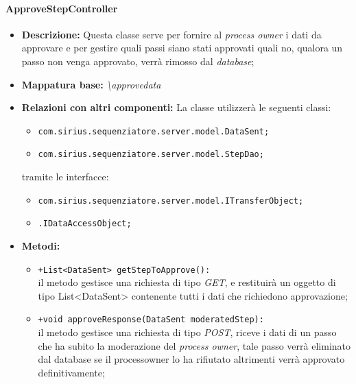 \paragraph{ApproveStepController}%
\begin{itemize}
	\item \textbf{Descrizione: } Questa classe serve per fornire al \textit{process owner} i dati da approvare e per gestire quali passi siano stati approvati quali no, qualora un passo non venga approvato, verrà rimosso dal \textit{database};
	\item \textbf{Mappatura base: } \textit{\textbackslash approvedata}
	\item \textbf{Relazioni con altri componenti: }
	La classe utilizzerà le seguenti classi:
	\begin{itemize}
		\item \texttt{com.sirius.sequenziatore.server.model.DataSent;}
		\item \texttt{com.sirius.sequenziatore.server.model.StepDao;}
	\end{itemize}
	tramite le interfacce:
	\begin{itemize}
		\item \texttt{com.sirius.sequenziatore.server.model.ITransferObject;}
		\item \texttt{\sModel .IDataAccessObject;}
	\end{itemize}
	\item \textbf{Metodi: }\begin{itemize}
					\item \texttt{+List<DataSent> getStepToApprove():}\\
					 il metodo gestisce una richiesta di tipo \textit{GET}, e restituirà un oggetto di tipo List<DataSent> contenente tutti i dati che richiedono approvazione;
					\item \texttt{+void approveResponse(DataSent moderatedStep):}\\
					il metodo gestisce una richiesta di tipo \textit{POST}, riceve i dati di un passo che ha subito la moderazione del \textit{process owner}, tale passo verrà eliminato dal database se il processowner lo ha rifiutato altrimenti verrà approvato definitivamente;  
				\end{itemize}
\end{itemize}